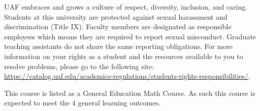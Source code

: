 \documentclass[12pt]{article}
\begin{document}




 UAF embraces and grows a culture of respect, diversity, inclusion, and caring. Students at this university are protected against sexual harassment and discrimination (Title IX). Faculty members are designated as responsible employees which means they are required to report sexual misconduct. Graduate teaching assistants do not share the same reporting obligations. For more information on your rights as a student and the resources available to you to resolve problems, please go to the following site: \url{https://catalog.uaf.edu/academics-regulations/students-rights-responsibilities/}.

 This course is listed as a General Education Math Course. As such this course is expected to meet the 4 general learning outcomes. 
\end{document}

